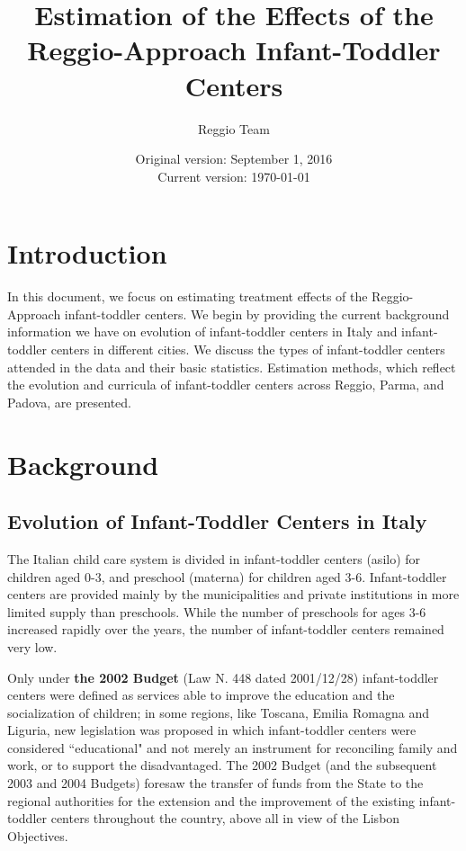 



\title{Estimation of the Effects of the Reggio-Approach Infant-Toddler Centers}
\author{Reggio Team}
\date{Original version: September 1, 2016 \\ Current version: \today}
\maketitle

\doublespacing

\section{Introduction}
In this document, we focus on estimating treatment effects of the Reggio-Approach infant-toddler centers. We begin by providing the current background information we have on evolution of infant-toddler centers in Italy and infant-toddler centers in different cities. We discuss the types of infant-toddler centers attended in the data and their basic statistics. Estimation methods, which reflect the evolution and curricula of infant-toddler centers across Reggio, Parma, and Padova, are presented.


\section{Background}
\subsection{Evolution of Infant-Toddler Centers in Italy}
The Italian child care system is divided in infant-toddler centers (asilo) for children aged 0-3, and preschool (materna) for children aged 3-6. Infant-toddler centers are provided mainly by the municipalities and private institutions in more limited supply than preschools. While the number of preschools for ages 3-6 increased rapidly over the years, the number of infant-toddler centers remained very low. 





Only under \textbf{the 2002 Budget} (Law N. 448 dated 2001/12/28) infant-toddler centers were defined as services able to improve the education and the socialization of children; in some regions, like Toscana, Emilia Romagna and Liguria, new legislation was proposed in which infant-toddler centers were considered ``educational" and not merely an instrument for reconciling family and work, or to support the disadvantaged. The 2002 Budget (and the subsequent 2003 and 2004 Budgets) foresaw the transfer of funds from the State to the regional authorities for the extension and the improvement of the existing infant-toddler centers throughout the country, above all in view of the Lisbon Objectives. 

